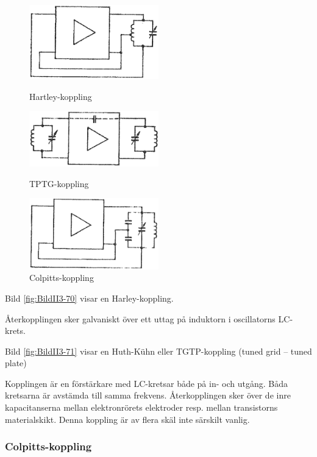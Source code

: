 \begin{figure}
  \includegraphics[width=0.5\textwidth]{images/cropped_pdfs/bild_2_3-70.pdf}
  \caption{Hartley-koppling}
  \label{fig:BildII3-70}

  \includegraphics[width=0.5\textwidth]{images/cropped_pdfs/bild_2_3-71.pdf}
  \caption{TPTG-koppling}
  \label{fig:BildII3-71}

  \includegraphics[width=0.5\textwidth]{images/cropped_pdfs/bild_2_3-72.pdf}
  \caption{Colpitts-koppling}
  \label{fig:BildII3-72}
\end{figure}

Bild \ref{fig:BildII3-70} visar en Harley-koppling.

Återkopplingen sker galvaniskt över ett uttag på induktorn i oscillatorns
LC-krets.

Bild \ref{fig:BildII3-71} visar en Huth-Kühn eller TGTP-koppling
(tuned grid -- tuned plate)

Kopplingen är en förstärkare med LC-kretsar både på in- och utgång.
Båda kretsarna är avstämda till samma frekvens.
Återkopplingen sker över de inre kapacitanserna mellan elektronrörets elektroder
resp. mellan transistorns materialskikt.
Denna koppling är av flera skäl inte särskilt vanlig.

\subsubsection{Colpitts-koppling}

